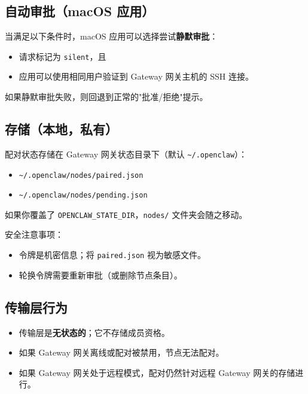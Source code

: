 \subsection{自动审批（macOS 应用）}


当满足以下条件时，macOS 应用可以选择尝试\textbf{静默审批}：

\begin{itemize}
  \item 请求标记为 \texttt{silent}，且
  \item 应用可以使用相同用户验证到 Gateway 网关主机的 SSH 连接。
\end{itemize}


如果静默审批失败，则回退到正常的"批准/拒绝"提示。

\subsection{存储（本地，私有）}


配对状态存储在 Gateway 网关状态目录下（默认 \texttt{\textasciitilde{}/.openclaw}）：

\begin{itemize}
  \item \texttt{\textasciitilde{}/.openclaw/nodes/paired.json}
  \item \texttt{\textasciitilde{}/.openclaw/nodes/pending.json}
\end{itemize}


如果你覆盖了 \texttt{OPENCLAW\_STATE\_DIR}，\texttt{nodes/} 文件夹会随之移动。

安全注意事项：

\begin{itemize}
  \item 令牌是机密信息；将 \texttt{paired.json} 视为敏感文件。
  \item 轮换令牌需要重新审批（或删除节点条目）。
\end{itemize}


\subsection{传输层行为}


\begin{itemize}
  \item 传输层是\textbf{无状态的}；它不存储成员资格。
  \item 如果 Gateway 网关离线或配对被禁用，节点无法配对。
  \item 如果 Gateway 网关处于远程模式，配对仍然针对远程 Gateway 网关的存储进行。
\end{itemize}



